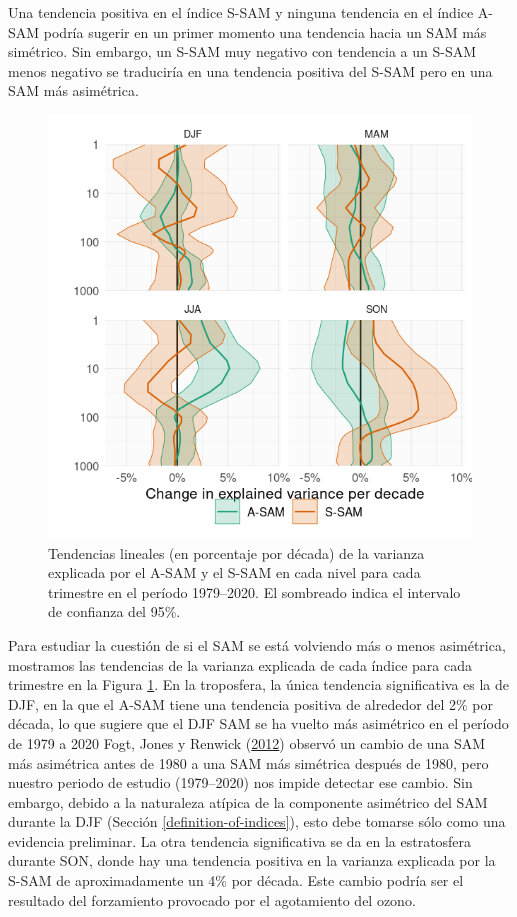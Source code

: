 \documentclass[12pt,oneside,a4paper]{reedthesis}
\begin{document}
Una tendencia positiva en el índice S-SAM y ninguna tendencia en el índice A-SAM podría sugerir en un primer momento una tendencia hacia un SAM más simétrico.
Sin embargo, un S-SAM muy negativo con tendencia a un S-SAM menos negativo se traduciría en una tendencia positiva del S-SAM pero en una SAM más asimétrica.



\begin{figure}

{\centering \includegraphics{figures/30-sam/r-squared-trend-1} 

}

\caption{Tendencias lineales (en porcentaje por década) de la varianza explicada por el A-SAM y el S-SAM en cada nivel para cada trimestre en el período 1979--2020. El sombreado indica el intervalo de confianza del 95\%.}\label{fig:r-squared-trend}
\end{figure}

Para estudiar la cuestión de si el SAM se está volviendo más o menos asimétrica, mostramos las tendencias de la varianza explicada de cada índice para cada trimestre en la Figura \ref{fig:r-squared-trend}.
En la troposfera, la única tendencia significativa es la de DJF, en la que el A-SAM tiene una tendencia positiva de alrededor del 2\% por década, lo que sugiere que el DJF SAM se ha vuelto más asimétrico en el período de 1979 a 2020 Fogt, Jones y Renwick (\protect\hyperlink{ref-fogt2012}{2012}) observó un cambio de una SAM más asimétrica antes de 1980 a una SAM más simétrica después de 1980, pero nuestro periodo de estudio (1979--2020) nos impide detectar ese cambio.
Sin embargo, debido a la naturaleza atípica de la componente asimétrico del SAM durante la DJF (Sección \ref{definition-of-indices}), esto debe tomarse sólo como una evidencia preliminar.
La otra tendencia significativa se da en la estratosfera durante SON, donde hay una tendencia positiva en la varianza explicada por la S-SAM de aproximadamente un 4\% por década.
Este cambio podría ser el resultado del forzamiento provocado por el agotamiento del ozono.
\end{document}
